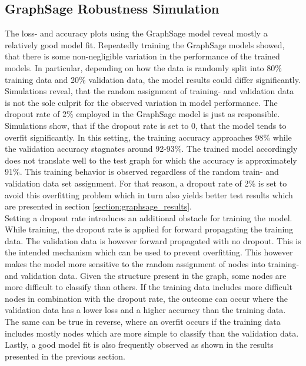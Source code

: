   \subsection{GraphSage Robustness Simulation}
  \label{section:graphsage_simulation}
  
  The loss- and accuracy plots using the GraphSage model reveal mostly a 
  relatively good model fit. Repeatedly training the GraphSage models showed, 
  that there is some non-negligible variation in the performance of the trained 
  models. In particular, depending on how the data is randomly split into 80\% training
  data and 20\% validation data, the model results could differ significantly.
  Simulations reveal, that the random assignment of training- and validation
  data is not the sole culprit for the observed variation in model performance. 
  The dropout rate of 2\% employed in the GraphSage model is just as responsible. 
  Simulations show, that if the dropout rate is set to 0, that the model tends
  to overfit significantly. In this setting, the training accuracy approaches
  98\% while the validation accuracy stagnates around 92-93\%. The trained model 
  accordingly does not translate well to the test graph for which the accuracy
  is approximately 91\%. This training behavior is observed regardless of the
  random train- and validation data set assignment. For that reason, a dropout 
  rate of 2\% is set to avoid this overfitting problem which in turn also 
  yields better test results which are presented in section 
  \ref{section:graphsage_results}. \\

  \noindent Setting a dropout rate introduces an additional obstacle
  for training the model. While training, the dropout rate is
  applied for forward propagating the training data. The validation data is 
  however forward propagated with no dropout. This is the intended mechanism
  which can be used to prevent overfitting. This however makes the model more
  sensitive to the random assignment of nodes into training- and validation
  data. Given the structure present in the graph, some nodes are more difficult
  to classify than others. If the training data includes more difficult nodes
  in combination with the dropout rate, the outcome can occur where the
  validation data has a lower loss and a higher accuracy than the training
  data. The same can be true in reverse, where an overfit occurs if the
  training data includes mostly nodes which are more simple to classify than
  the validation data. Lastly, a good model fit is also frequently observed as
  shown in the results presented in the previous section. \\

